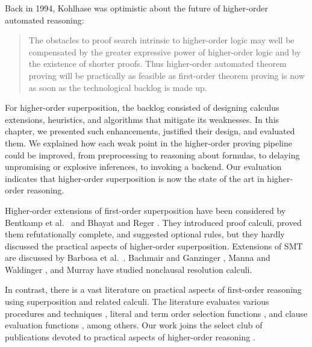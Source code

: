 \begin{sloppypar}
Back in 1994, Kohlhase \cite[Sect.~1.3]{mk-94-hores} was optimistic about the
future of higher-order automated reasoning:
%
\begin{quote}
  The obstacles to proof search intrinsic
  to higher-order logic may well be compensated by the greater expressive power
  of higher-order logic and by the existence of shorter proofs. Thus
  higher-order automated theorem proving will be practically as feasible as
  first-order theorem proving is now as soon as the technological backlog is made up.
\end{quote}
%
For higher-order superposition, the backlog consisted of designing calculus
extensions, heuristics, and algorithms that mitigate its weaknesses. In
this chapter, we presented such enhancements, justified their design, and
evaluated them. We explained how each weak point in the
higher-order proving pipeline could be improved, from preprocessing to reasoning
about formulas, to delaying unpromising or explosive inferences, to invoking a
backend. Our evaluation indicates that higher-order superposition is now the
state of the art in higher-order reasoning.
\end{sloppypar}

Higher-order extensions of first-order superposition have been
considered %
by Bentkamp et al.\
\cite{bbtvw-21-sup-lam, bbcw-21-lfho} and Bhayat and Reger
\cite{br-19-restricted-unif, br-20-full-sup-w-combs}. They introduced proof calculi,
proved them refutationally complete, and suggested optional rules, but
they hardly discussed the practical aspects of higher-order superposition. Extensions
of SMT are discussed by Barbosa et al.\ \cite{brotb-19-ho-smt}.
Bachmair and Ganzinger \cite{bg-1992-nonclausal}, Manna and Waldinger
\cite{mw-1979-nonclausal}, and Murray \cite{nm-1982-nonclausal} have studied
nonclausal resolution calculi.

In contrast, there is a vast literature on practical aspects of first-order
reasoning using superposition and related calculi.
The literature evaluates various procedures and techniques
\cite{hv-09-unifalgs,rsv-15-playing-with-avatar}, literal and term order selection
functions \cite{hrsv-16-selsel}, and clause evaluation functions
\cite{sm-16-clausesel, gs-20-clausesel}, among others. Our work joins the
select club of publications devoted to practical aspects of higher-order
reasoning
\cite{sb-15-beta,wskb-16-effective-norm,fb-2016-internal-guidance-satallax,benzmueller-et-al-05-can-ho-fo-coop}.


